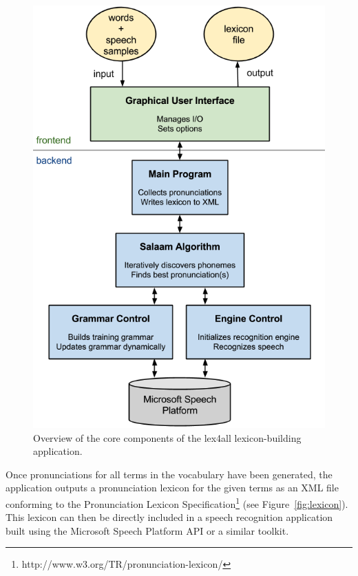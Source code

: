 \documentclass[11pt]{article}
\begin{document}
\begin{figure}[t]
\begin{center}
\includegraphics[width=\columnwidth]{../img/SystemOverview-compact.png}
\caption{Overview of the core components of the lex4all lexicon-building application.\label{fig:system}}
\end{center}
\end{figure}

Once pronunciations for all terms in the vocabulary have been generated, the application outputs a pronunciation lexicon for the given terms as an XML file conforming to the Pronunciation Lexicon Specification\footnote{http://www.w3.org/TR/pronunciation-lexicon/} (see Figure~\ref{fig:lexicon}). This lexicon can then be directly included in a speech recognition application built using the Microsoft Speech Platform API or a similar toolkit.
\end{document}
